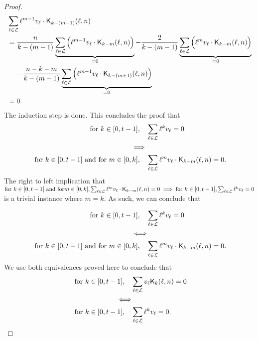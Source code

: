 \begin{proof}
    \begin{equation*}
        \begin{split}
            & \sum_{\ell \in \mathcal{L}} \ell^{m-1}v_\ell \cdot \mathsf{K}_{k-(m-1)}(\ell,n)\\
            &= \frac{n}{k-(m-1)}\underbrace{\sum_{\ell \in \mathcal{L}} \Big(\ell^{m-1}v_\ell\cdot \mathsf{K}_{k-m}(\ell,n) \Big)}_{=0} - \frac{2}{k-(m-1)}\underbrace{\sum_{\ell \in \mathcal{L}} \Big(\ell^mv_\ell\cdot \mathsf{K}_{k-m}(\ell,n)\Big)}_{=0}\\
            &\quad -\frac{n-k-m}{k-(m-1)}\underbrace{\sum_{\ell \in \mathcal{L}}\Big(\ell^{m-1}v_\ell\cdot \mathsf{K}_{k-(m+1)}(\ell,n)\Big)}_{=0}\\
            &= 0.
        \end{split}
    \end{equation*}
    The induction step is done. This concludes the proof that
    \begin{equation*}
        \begin{split}
            \text{for } k \in [0, t-1], \quad &\sum_{\ell \in \mathcal{L}} \ell^kv_\ell = 0\\
            \implies\\
            \text{ for } k \in [0, t-1] \text{ and for } m \in [0, k], \quad &\sum_{\ell \in \mathcal{L}} \ell^mv_\ell\cdot \mathsf{K}_{k-m}(\ell,n) = 0.
        \end{split}
    \end{equation*}
    The right to left implication that $\text{for } k \in [0, t-1] \text{ and for} m \in [0, k], \sum_{\ell \in \mathcal{L}} \ell^mv_\ell \cdot \mathsf{K}_{k-m}(\ell,n) = 0 \implies \text{for } k \in [0, t-1], \sum_{\ell \in \mathcal{L}} \ell^kv_\ell = 0$ is a trivial instance where $m = k$.
    As such, we can conclude that

    \begin{equation*}
        \begin{split}
            \text{for } k \in [0, t-1], \quad &\sum_{\ell \in \mathcal{L}} \ell^kv_\ell = 0\\
            \Longleftrightarrow\\
            \text{ for } k \in [0, t-1] \text{ and for } m \in [0, k], \quad &\sum_{\ell \in \mathcal{L}} \ell^mv_\ell\cdot \mathsf{K}_{k-m}(\ell,n) = 0.
        \end{split}
    \end{equation*}
    We use both equivalences proved here to conclude that
    \begin{equation*}
        \begin{split}
            \text{for } k \in [0, t-1], \quad &\sum_{\ell \in \mathcal{L}} v_\ell \mathsf{K}_{k}(\ell,n) = 0\\
            \Longleftrightarrow\\
            \text{ for } k \in [0, t-1], \quad &\sum_{\ell \in \mathcal{L}} \ell^kv_\ell = 0.
        \end{split}
    \end{equation*}
\end{proof}


